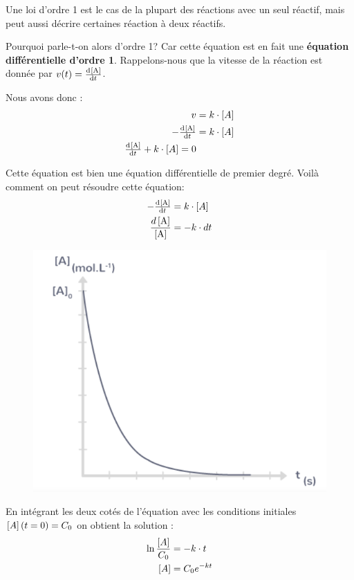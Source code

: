 \documentclass[11pt,a4paper]{article}
\begin{document}
Une loi d'ordre 1 est le cas de la plupart des réactions avec un seul réactif, mais peut aussi décrire certaines réaction à deux réactifs. 

Pourquoi parle-t-on alors d'ordre 1? Car cette équation est en fait une \textbf{équation différentielle d'ordre 1}. Rappelons-nous que la vitesse de la réaction est donnée par $ v(t) = \od{\conc{\ce{A}}}{t}$. 

Nous avons donc : 
\begin{align*}
   v &= k\cdot\conc{A} \\
   -\od{\conc{\ce{A}}}{t} &= k\cdot\conc{A} \\
   \od{\conc{\ce{A}}}{t} + k\cdot\conc{A} = 0
\end{align*}

Cette équation est bien une équation différentielle de premier degré. Voilà comment on peut résoudre cette équation: 
\begin{align*}
   -\od{\conc{\ce{A}}}{t} &= k\cdot\conc{A} \\
   \dfrac{d\conc{\ce{A}}}{\conc{\ce{A}}} &= -k\cdot dt 
\end{align*}

\begingroup
\begin{figure}
  \centering\includegraphics[width=.9\linewidth]{imgs/c4/decroit.png}
\end{figure}

En intégrant les deux cotés de l'équation avec les conditions initiales $\left[{A}\right](t=0) = C_0$ on obtient la solution : 
\begin{align*}
    \ln{\dfrac{\left[{A}\right]}{C_0}} &= -k\cdot t \\
    \left[{A}\right] &= C_0e^{-kt}
\end{align*}
\end{document}
